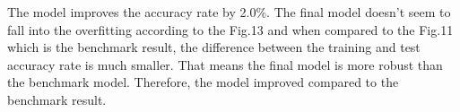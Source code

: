 
The model improves the accuracy rate by 2.0\%. The final model doesn't seem to fall into the overfitting according to the Fig.13 and when compared to the Fig.11 which is the benchmark result, the difference between the training and test accuracy rate is much smaller. That means the final model is more robust than the benchmark model. Therefore, the model improved compared to the benchmark result.




